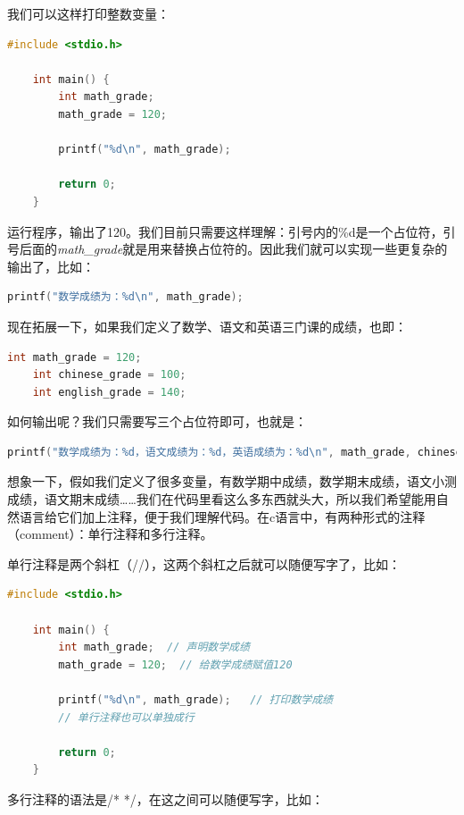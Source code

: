我们可以这样打印整数变量：

\begin{lstlisting}[language=C]
    #include <stdio.h>

    int main() {
        int math_grade;
        math_grade = 120;

        printf("%d\n", math_grade); 

        return 0;
    }
\end{lstlisting}

运行程序，输出了120。我们目前只需要这样理解：引号内的\%d是一个占位符，引号后面的\textit{math\_grade}就是用来替换占位符的。因此我们就可以实现一些更复杂的输出了，比如：

\begin{lstlisting}[language=C]
    printf("数学成绩为：%d\n", math_grade); 
\end{lstlisting}

现在拓展一下，如果我们定义了数学、语文和英语三门课的成绩，也即：

\begin{lstlisting}[language=C]
    int math_grade = 120;
    int chinese_grade = 100;
    int english_grade = 140;
\end{lstlisting}

如何输出呢？我们只需要写三个占位符即可，也就是：

\begin{lstlisting}[language=C]
    printf("数学成绩为：%d，语文成绩为：%d，英语成绩为：%d\n", math_grade, chinese_grade, english_grade); 
\end{lstlisting}

想象一下，假如我们定义了很多变量，有数学期中成绩，数学期末成绩，语文小测成绩，语文期末成绩……我们在代码里看这么多东西就头大，所以我们希望能用自然语言给它们加上注释，便于我们理解代码。在c语言中，有两种形式的注释（comment）：单行注释和多行注释。

单行注释是两个斜杠（//），这两个斜杠之后就可以随便写字了，比如：

\begin{lstlisting}[language=C]
    #include <stdio.h>

    int main() {
        int math_grade;  // 声明数学成绩
        math_grade = 120;  // 给数学成绩赋值120

        printf("%d\n", math_grade);   // 打印数学成绩
        // 单行注释也可以单独成行

        return 0;
    }
\end{lstlisting}

多行注释的语法是/* */，在这之间可以随便写字，比如：

